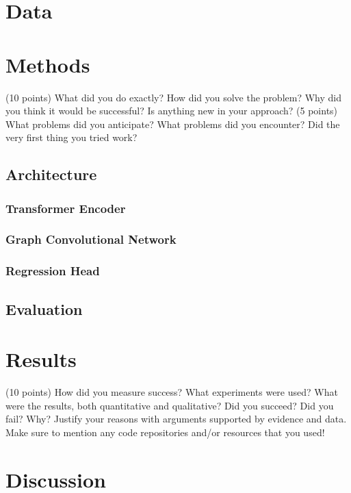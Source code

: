\documentclass[10pt,twocolumn,letterpaper]{article}
\begin{document}
\section{Data}
\cite{tang2008arnetminer}

\section{Methods}

(10 points) What did you do exactly? How did you solve the problem? Why did you think it would
be successful? Is anything new in your approach?
(5 points) What problems did you anticipate? What problems did you encounter? Did the very first
thing you tried work?

\subsection{Architecture}

\subsubsection{Transformer Encoder}

\subsubsection{Graph Convolutional Network}

\subsubsection{Regression Head}

\subsection{Evaluation}

\section{Results}

(10 points) How did you measure success? What experiments were used? What were the results,
both quantitative and qualitative? Did you succeed? Did you fail? Why? Justify your reasons with
arguments supported by evidence and data. Make sure to mention any code repositories and/or
resources that you used!

\section{Discussion}


{\small


}
\end{document}
